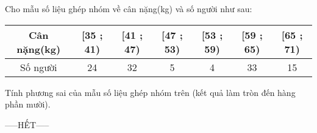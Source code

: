 \documentclass[12pt,a4paper]{article}
\begin{document}
\begin{ex}
 Cho mẫu số liệu ghép nhóm về cân nặng(kg) và số người như sau:
\begin{center}
\begin{tabular}{|c|c|c|c|c|c|c|}
        \hline
        Cân nặng(kg)   & [35 ; 41) & [41 ; 47) & [47 ; 53) & [53 ; 59) & [59 ; 65) & [65 ; 71)\\  
        \hline 
        Số người & 24 & 32 & 5 & 4 & 33 & 15 \\ 
        \hline 
    \end{tabular}

\end{center}
 Tính phương sai của mẫu số liệu ghép nhóm trên (kết quả làm tròn đến hàng phần mười).

\end{ex}


 \begin{center}
-----HẾT-----
\end{center}

\newpage 
\end{document}
